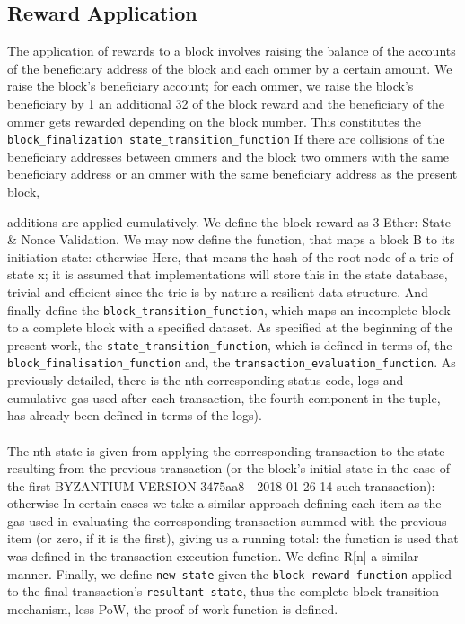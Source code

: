 \documentclass[10pt,a4paper,leqno,bibliography=totoc]{scrartcl}
\newenvironment{alphafootnotes}
{\par\edef\savedfootnotenumber{\number\value{footnote}}
\renewcommand{\thefootnote}{\alph{footnote}}
\setcounter{footnote}{0}}
{\par\setcounter{footnote}{\savedfootnotenumber}}
\begin{document}
\begin{alphafootnotes}
\begin{multicols*}{2}
		\subsection{Reward Application} The application of rewards to a block involves raising the balance of the accounts of the beneficiary address of the block and each ommer by a certain amount. We raise the block’s beneficiary account; for each ommer, we raise the block’s beneficiary by 1 an additional 32 of the block reward and the beneficiary of the ommer gets rewarded depending on the block number. This constitutes the \texttt{block\_finalization state\_transition\_function} If there are collisions of the beneficiary addresses between ommers and the block two ommers with the same beneficiary address or an ommer with the same beneficiary address as the present block,

			additions are applied cumulatively. We define the block reward as 3 Ether: State \& Nonce Validation. We may now define the function, that maps a block B to its initiation state: otherwise Here, that means the hash of the root node of a trie of state x; it is assumed that implementations will store this in the state database, trivial and efficient since the trie is by nature a resilient data structure. And finally define the \texttt{block\_transition\_function}, which maps an incomplete block to a complete block with a specified dataset. As specified at the beginning of the present work, the \texttt{state\_transition\_function}, which is defined in terms of, the \texttt{block\_finalisation\_function} and, the \texttt{transaction\_evaluation\_function}. As previously detailed, there is the nth corresponding status code, logs and cumulative gas used after each transaction, the fourth component in the tuple, has already been defined in terms of the logs). 
		\paragraph{}The nth state is given from applying the corresponding transaction to the state resulting from the previous transaction (or the block’s initial state in the case of the first BYZANTIUM VERSION 3475aa8 - 2018-01-26 14 such transaction): otherwise In certain cases we take a similar approach defining each item as the gas used in evaluating the corresponding transaction summed with the previous item (or zero, if it is the first), giving us a running total: the function is used that was defined in the transaction execution function. We define R[n] a similar manner. Finally, we define \texttt{new state} given the \texttt{block reward function} applied to the final transaction’s \texttt{resultant state}, thus the complete block-transition mechanism, less PoW, the proof-of-work function is defined. 
		

\end{multicols*}
\end{alphafootnotes}
\end{document}
